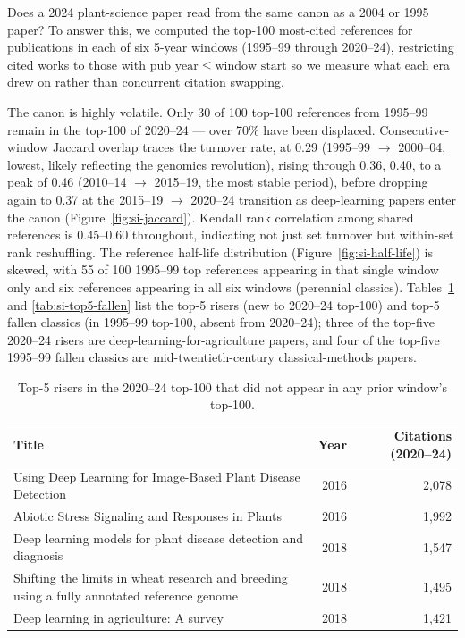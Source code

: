 
Does a 2024 plant-science paper read from the same canon as a 2004
or 1995 paper? To answer this, we computed the top-100 most-cited
references for publications in each of six 5-year windows
(1995--99 through 2020--24), restricting cited works to those with
$\mathrm{pub\_year} \leq \mathrm{window\_start}$ so we measure what
each era drew on rather than concurrent citation swapping.

The canon is highly volatile. Only 30 of 100 top-100 references
from 1995--99 remain in the top-100 of 2020--24 --- over 70\% have
been displaced. Consecutive-window Jaccard overlap traces the
turnover rate, at 0.29 (1995--99 $\to$ 2000--04, lowest, likely
reflecting the genomics revolution), rising through 0.36, 0.40, to
a peak of 0.46 (2010--14 $\to$ 2015--19, the most stable period),
before dropping again to 0.37 at the 2015--19 $\to$ 2020--24
transition as deep-learning papers enter the canon
(Figure~\ref{fig:si-jaccard}). Kendall rank correlation
among shared references is 0.45--0.60 throughout, indicating not
just set turnover but within-set rank reshuffling. The reference
half-life distribution (Figure~\ref{fig:si-half-life}) is
skewed, with 55 of 100 1995--99 top references appearing in that single
window only and six references appearing in all six windows (perennial
classics). Tables~\ref{tab:si-top5-risers} and \ref{tab:si-top5-fallen}
list the top-5 risers (new to 2020--24 top-100) and top-5 fallen
classics (in 1995--99 top-100, absent from 2020--24); three of the
top-five 2020--24 risers are deep-learning-for-agriculture papers,
and four of the top-five 1995--99 fallen classics are
mid-twentieth-century classical-methods papers.

\begin{table}[H]
\centering
\caption{Top-5 risers in the 2020--24 top-100 that did not appear in
any prior window's top-100.}
\label{tab:si-top5-risers}
\begin{tabular}{p{10cm}rr}
\toprule
Title & Year & Citations (2020--24) \\
\midrule
Using Deep Learning for Image-Based Plant Disease Detection & 2016 & 2{,}078 \\
Abiotic Stress Signaling and Responses in Plants & 2016 & 1{,}992 \\
Deep learning models for plant disease detection and diagnosis & 2018 & 1{,}547 \\
Shifting the limits in wheat research and breeding using a fully annotated reference genome & 2018 & 1{,}495 \\
Deep learning in agriculture: A survey & 2018 & 1{,}421 \\
\bottomrule
\end{tabular}
\end{table}

